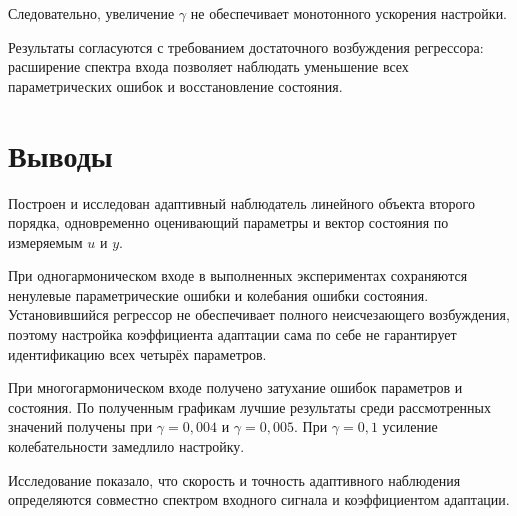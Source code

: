 Следовательно, увеличение $\gamma$ не обеспечивает
монотонного ускорения настройки.

Результаты согласуются с требованием достаточного возбуждения
регрессора: расширение спектра входа позволяет наблюдать уменьшение
всех параметрических ошибок и восстановление состояния.


\section{Выводы}

Построен и исследован адаптивный наблюдатель линейного объекта
второго порядка, одновременно оценивающий параметры и вектор состояния
по измеряемым $u$ и $y$.

При одногармоническом входе в выполненных экспериментах
сохраняются ненулевые параметрические ошибки и колебания ошибки состояния.
Установившийся регрессор не обеспечивает полного неисчезающего
возбуждения, поэтому настройка коэффициента адаптации
сама по себе не гарантирует идентификацию всех четырёх параметров.

При многогармоническом входе получено затухание ошибок параметров
и состояния. По полученным графикам лучшие
результаты среди рассмотренных значений получены при
$\gamma=0{,}004$ и $\gamma=0{,}005$.
При $\gamma=0{,}1$ усиление колебательности замедлило настройку.

Исследование показало, что скорость и точность адаптивного наблюдения
определяются совместно спектром входного сигнала и коэффициентом адаптации.
